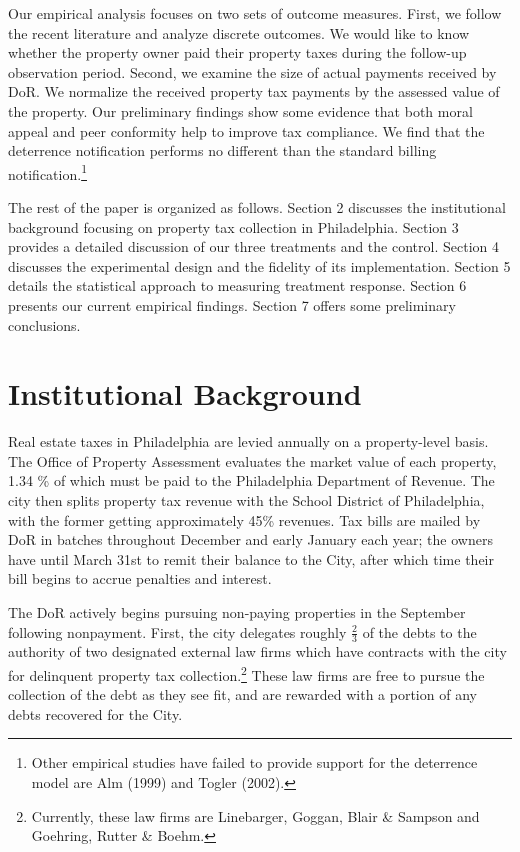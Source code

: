 \documentclass[12pt,titlepage]{article}
\begin{document}
Our empirical analysis focuses on two sets of outcome measures. First,
we follow the recent literature and analyze discrete outcomes. We
would like to know whether the property owner paid their property taxes
during the follow-up observation period.  Second, we examine the size 
of actual payments received by DoR.  We normalize the
received property tax payments by the assessed value of the property.
Our preliminary findings show some evidence that both moral appeal
and peer conformity help to improve tax compliance. We find
that the deterrence notification performs no different than the standard billing 
notification.\footnote{Other empirical studies have failed to provide support for the deterrence
model are Alm (1999) and Togler (2002).}

The rest of the paper is organized as follows. Section 2 discusses the
institutional background focusing on property tax collection in
Philadelphia.  Section 3 provides a detailed discussion of our
three treatments and the control. Section 4 discusses the experimental design and the
fidelity of its implementation. Section 5 details the statistical
approach to measuring treatment response.  Section 6 
presents our current empirical findings.  Section 7 offers some preliminary conclusions.


\section{Institutional Background}

Real estate taxes in Philadelphia are levied annually on a property-level basis.  
The Office of Property Assessment evaluates the market value of each
property, 1.34 \% of which must be paid to the Philadelphia Department
of Revenue. The city then splits property tax revenue with the School District of Philadelphia, 
with the former getting approximately 45\% revenues. 
Tax bills are mailed by DoR in batches throughout December and early January each year; 
the owners have until March 31st to remit their balance to the City, after which
time their bill begins to accrue penalties and interest.

The DoR actively begins pursuing non-paying properties in the
September following nonpayment.  First, the city delegates roughly
$\frac{2}{3}$ of the debts to the authority of two
designated external law firms which have contracts with the city for
delinquent property tax collection.\footnote{Currently, these law firms are Linebarger, Goggan,
  Blair \& Sampson and Goehring, Rutter \& Boehm.} These law firms
are free to pursue the collection of the debt as they see fit, and are
rewarded with a portion of any debts recovered for the City.
\end{document}
